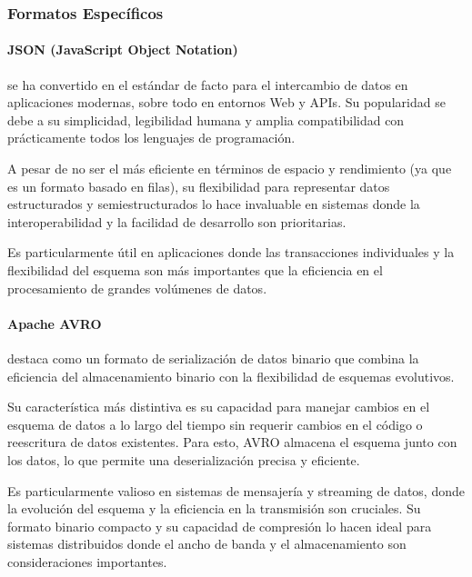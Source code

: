 \subsubsection{Formatos Específicos}

\paragraph{JSON (JavaScript Object Notation)} 
se ha convertido en el estándar de facto para el intercambio 
de datos en aplicaciones modernas, sobre todo en entornos Web y APIs. Su popularidad se debe a su 
simplicidad, legibilidad humana y amplia compatibilidad con prácticamente todos los lenguajes de 
programación. \newline

A pesar de no ser el más eficiente en términos de espacio y rendimiento (ya que es un formato basado en filas), 
su flexibilidad para representar datos estructurados y semiestructurados lo hace invaluable en sistemas donde la 
interoperabilidad y la facilidad de desarrollo son prioritarias. \newline

Es particularmente útil en aplicaciones
donde las transacciones individuales y la flexibilidad del esquema son más importantes que la 
eficiencia en el procesamiento de grandes volúmenes de datos.

\paragraph{Apache AVRO} 
destaca como un formato de serialización de datos binario que combina la 
eficiencia del almacenamiento binario con la flexibilidad de esquemas evolutivos. \newline 

Su característica más distintiva es su capacidad para manejar cambios en el esquema de datos a lo largo del tiempo sin 
requerir cambios en el código o reescritura de datos existentes. Para esto, AVRO almacena el esquema junto con 
los datos, lo que permite una deserialización precisa y eficiente.\newline 

Es particularmente valioso en sistemas de mensajería y streaming de datos, donde la evolución del esquema y la 
eficiencia en la transmisión son cruciales. Su formato binario compacto y su capacidad de compresión 
lo hacen ideal para sistemas distribuidos donde el ancho de banda y el almacenamiento son 
consideraciones importantes.

